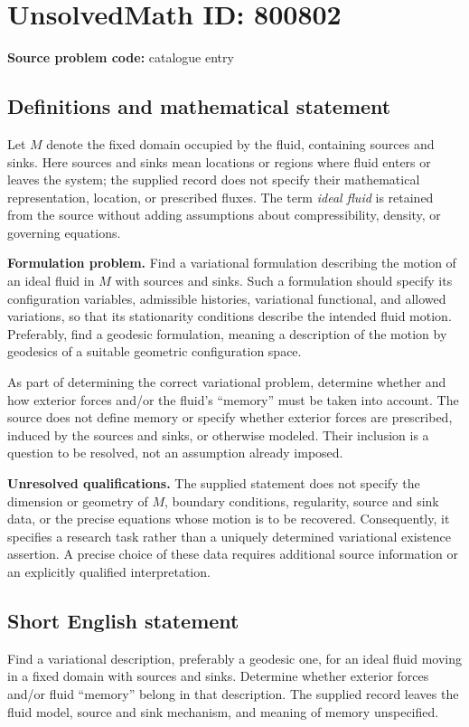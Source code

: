 \documentclass[11pt]{article}
\begin{document}
\section*{UnsolvedMath ID: 800802}
\textbf{Source problem code:} catalogue entry
\subsection{Definitions and mathematical statement}
Let \(M\) denote the fixed domain occupied by the fluid, containing sources and sinks. Here sources and sinks mean locations or regions where fluid enters or leaves the system; the supplied record does not specify their mathematical representation, location, or prescribed fluxes. The term \emph{ideal fluid} is retained from the source without adding assumptions about compressibility, density, or governing equations.

\textbf{Formulation problem.} Find a variational formulation describing the motion of an ideal fluid in \(M\) with sources and sinks. Such a formulation should specify its configuration variables, admissible histories, variational functional, and allowed variations, so that its stationarity conditions describe the intended fluid motion. Preferably, find a geodesic formulation, meaning a description of the motion by geodesics of a suitable geometric configuration space.

As part of determining the correct variational problem, determine whether and how exterior forces and/or the fluid's ``memory'' must be taken into account. The source does not define memory or specify whether exterior forces are prescribed, induced by the sources and sinks, or otherwise modeled. Their inclusion is a question to be resolved, not an assumption already imposed.

\textbf{Unresolved qualifications.} The supplied statement does not specify the dimension or geometry of \(M\), boundary conditions, regularity, source and sink data, or the precise equations whose motion is to be recovered. Consequently, it specifies a research task rather than a uniquely determined variational existence assertion. A precise choice of these data requires additional source information or an explicitly qualified interpretation.
\subsection{Short English statement}
Find a variational description, preferably a geodesic one, for an ideal fluid moving in a fixed domain with sources and sinks. Determine whether exterior forces and/or fluid ``memory'' belong in that description. The supplied record leaves the fluid model, source and sink mechanism, and meaning of memory unspecified.
\end{document}
